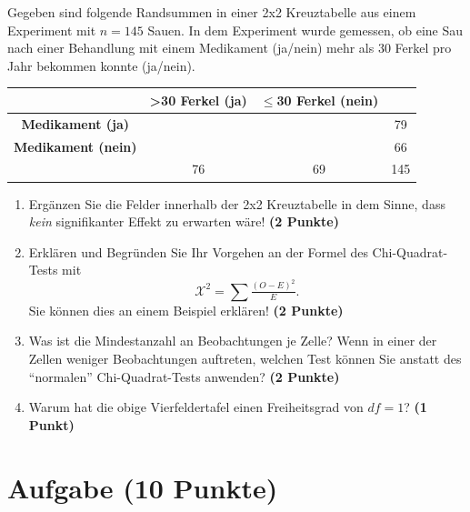 \documentclass[a4paper, 9pt]{scrartcl}\usepackage[]{graphicx}\usepackage[]{xcolor}
\begin{document}
Gegeben sind folgende Randsummen in einer 2x2 Kreuztabelle aus einem
Experiment mit $n = 145$ Sauen. In dem Experiment wurde gemessen,
ob eine Sau nach einer Behandlung mit einem Medikament (ja/nein)
mehr als 30 Ferkel pro Jahr bekommen konnte (ja/nein).

\vspace{5Ex}

\begin{center}
  \Large
  \begin{tabular}{c|c|c|c}
     & \textbf{>30 Ferkel (ja)} & \textbf{$\leq$30 Ferkel (nein)} &  \strut\\
    \hline
    \textbf{Medikament (ja)} & \phantom{100}  & \phantom{100}  &   79  \strut\\
    \hline
    \textbf{Medikament (nein)} & \phantom{100}  & \phantom{100}  &   66   \strut\\
    \hline
     &  76 &  69 &  145  \strut\\
  \end{tabular}
\end{center}



\vspace{5Ex}

\begin{enumerate}
\item Erg{\"a}nzen Sie die Felder innerhalb der 2x2 Kreuztabelle in dem Sinne,
  dass \textit{kein} signifikanter Effekt zu erwarten w{\"a}re!
  \textbf{(2 Punkte)}
\item Erkl{\"a}ren und Begr{\"u}nden Sie Ihr Vorgehen an der Formel des
  Chi-Quadrat-Tests mit
  \begin{equation*}
  \mathcal{X}^2 = \sum\tfrac{(O - E)^2}{E}.  
  \end{equation*}
  Sie k{\"o}nnen dies an einem Beispiel erkl{\"a}ren! \textbf{(2 Punkte)}
\item Was ist die Mindestanzahl an Beobachtungen je Zelle? Wenn in einer
  der Zellen weniger Beobachtungen auftreten, welchen Test k{\"o}nnen Sie
  anstatt des "`normalen"' Chi-Quadrat-Tests anwenden? \textbf{(2 Punkte)}
\item Warum hat die obige Vierfeldertafel einen Freiheitsgrad von $df=1$?
  \textbf{(1 Punkt)}
\end{enumerate} 
\clearpage

\section{Aufgabe \hfill (10 Punkte)}
\end{document}
